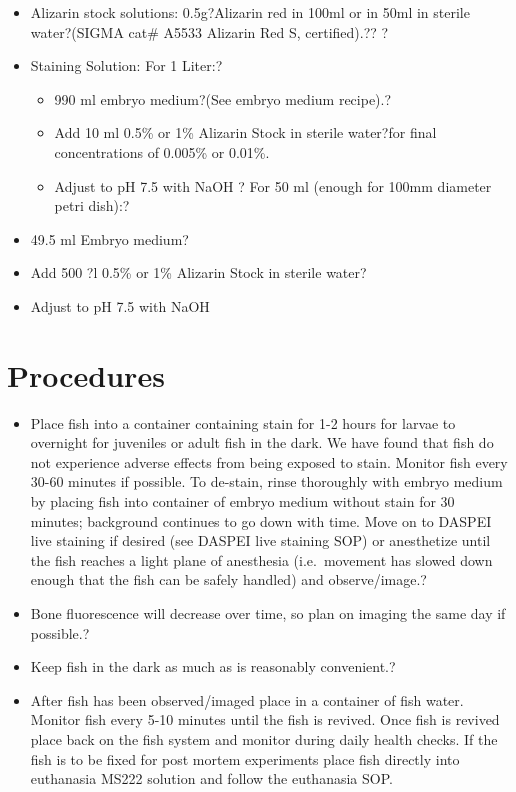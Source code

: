 \documentclass[
  letterpaper,
  DIV=11,
  numbers=noendperiod]{scrreprt}
\providecommand{\tightlist}{%
  \setlength{\itemsep}{0pt}\setlength{\parskip}{0pt}}\usepackage{longtable,booktabs,array}
\begin{document}
\begin{itemize}
\tightlist
\item
  Alizarin stock solutions: 0.5g?Alizarin red in 100ml or in 50ml in
  sterile water?(SIGMA cat\# A5533 Alizarin Red S, certified).?? ?
\item
  Staining Solution: For 1 Liter:?

  \begin{itemize}
  \tightlist
  \item
    990 ml embryo medium?(See embryo medium recipe).?
  \item
    Add 10 ml 0.5\% or 1\% Alizarin Stock in sterile water?for final
    concentrations of 0.005\% or 0.01\%.
  \item
    Adjust to pH 7.5 with NaOH ? For 50 ml (enough for 100mm diameter
    petri dish):?
  \end{itemize}
\item
  49.5 ml Embryo medium?
\item
  Add 500 ?l 0.5\% or 1\% Alizarin Stock in sterile water?
\item
  Adjust to pH 7.5 with NaOH
\end{itemize}

\hypertarget{procedures-1}{%
\section{Procedures}\label{procedures-1}}

\begin{itemize}
\tightlist
\item
  Place fish into a container containing stain for 1-2 hours for larvae
  to overnight for juveniles or adult fish in the dark. We have found
  that fish do not experience adverse effects from being exposed to
  stain. Monitor fish every 30-60 minutes if possible. To de-stain,
  rinse thoroughly with embryo medium by placing fish into container of
  embryo medium without stain for 30 minutes; background continues to go
  down with time. Move on to DASPEI live staining if desired (see DASPEI
  live staining SOP) or anesthetize until the fish reaches a light plane
  of anesthesia (i.e.~movement has slowed down enough that the fish can
  be safely handled) and observe/image.?
\item
  Bone fluorescence will decrease over time, so plan on imaging the same
  day if possible.?
\item
  Keep fish in the dark as much as is reasonably convenient.?
\item
  After fish has been observed/imaged place in a container of fish
  water. Monitor fish every 5-10 minutes until the fish is revived. Once
  fish is revived place back on the fish system and monitor during daily
  health checks. If the fish is to be fixed for post mortem experiments
  place fish directly into euthanasia MS222 solution and follow the
  euthanasia SOP.
\end{itemize}
\end{document}

